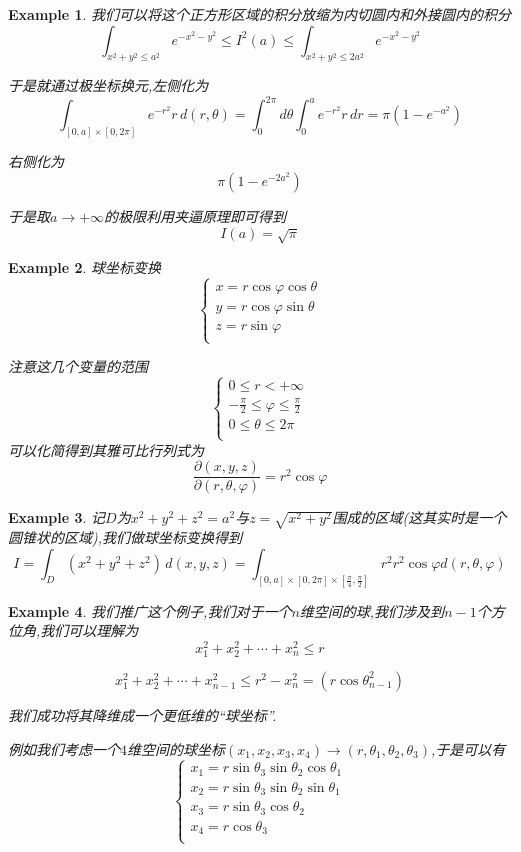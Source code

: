 \documentclass[11pt,hyperref,a4paper,UTF8]{ctexart}
\newtheorem{example}{Example}[subsection]
\begin{document}
\begin{CJK}{UTF8}{gkai}
\begin{example}
  我们可以将这个正方形区域的积分放缩为内切圆内和外接圆内的积分
  \[\int_{x^2 + y^2 \leq a^2} e^{-x^2 - y^2} \leq I^2(a) \leq  \int_{x^2 + y^2 \leq 2a^2} e^{-x^2 - y^2}\]

  于是就通过极坐标换元,左侧化为
  \[\int_{[0,a] \times [0,2\pi]} e^{-r^2} r\, d(r,\theta) = \int_{0}^{2\pi} d\theta \int_{0}^{a} e^{-r^2} r \, dr = \pi (1 - e^{-a^2})\]

  右侧化为
  \[\pi (1 - e^{-2a^2})\]

  于是取$a \to +\infty$的极限利用夹逼原理即可得到
  \[I(a) = \sqrt{\pi}\]
\end{example}

\begin{example}
  球坐标变换
  \[\begin{cases}
    x = r \cos \varphi \cos \theta\\
    y = r \cos \varphi \sin \theta\\
    z = r \sin \varphi\\
  \end{cases}\]

  注意这几个变量的范围
  \[\begin{cases}
    0 \leq r < +\infty\\
    -\frac{\pi}{2} \leq \varphi \leq \frac{\pi}{2}\\
    0 \leq \theta \leq 2\pi\\
  \end{cases}\]
  可以化简得到其雅可比行列式为
  \[\frac{\partial(x,y,z)}{\partial(r,\theta,\varphi)} = r^2 \cos \varphi\]
\end{example}

\begin{example}
  记$D$为$x^2 + y^2 + z^2 = a^2$与$z = \sqrt{x^2 + y^2}$围成的区域(这其实时是一个圆锥状的区域),我们做球坐标变换得到
  \[I = \int_{D} (x^2 + y^2 + z^2) \, d(x,y,z) = \int_{[0,a]\times [0,2\pi]\times [\frac{\pi}{4},\frac{\pi}{2}]} r^2 r^2 \cos \varphi d(r,\theta,\varphi)\]
\end{example}

\begin{example}
  我们推广这个例子,我们对于一个$n$维空间的球,我们涉及到$n - 1$个方位角,我们可以理解为
  \[x_1^2 + x_2^2 + \cdots + x_n^2 \leq r\]

  \[x_1^2 + x_2^2 + \cdots + x_{n - 1}^2 \leq r^2 - x_n^2 = (r \cos \theta_{n - 1}^2)\]

  我们成功将其降维成一个更低维的``球坐标''.

  例如我们考虑一个$4$维空间的球坐标$(x_1,x_2,x_3,x_4) \to (r,\theta_1,\theta_2,\theta_3)$,于是可以有
  \[\begin{cases}
    x_1 = r \sin \theta_3 \sin \theta_2 \cos \theta_1\\
    x_2 = r \sin \theta_3 \sin \theta_2 \sin \theta_1\\
    x_3 = r \sin \theta_3 \cos \theta_2\\
    x_4 = r \cos \theta_3\\
  \end{cases}\]


\end{example}
\end{CJK}
\end{document}
